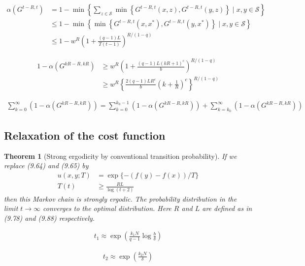 \documentclass{article}
\newtheorem{theorem}{Theorem}
\begin{document}
\begin{align*}
\alpha\left(G^{t-R, t}\right) & =1-\min \left\{\sum_{z \in \mathcal{S}} \min \left\{G^{t-R, t}(x, z), G^{t-R, t}(y, z)\right\} \mid x, y \in \mathcal{S}\right\} \\
& \leq 1-\min \left\{\min \left\{G^{t-R, t}\left(x, x^{*}\right), G^{t-R, t}\left(y, x^{*}\right)\right\} \mid x, y \in \mathcal{S}\right\} \\
& \leq 1-w^{R}\left(1+\frac{(q-1) L}{T(t-1)}\right)^{R /(1-q)}
\tag{9.92}
\end{align*}

\begin{align*}
1-\alpha\left(G^{k R-R, k R}\right) & \geq w^{R}\left(1+\frac{(q-1) L(k R+1)^{c}}{b}\right)^{R /(1-q)} \\
& \geq w^{R}\left\{\frac{2(q-1) L R^{c}}{b}\left(k+\frac{1}{R}\right)^{c}\right\}^{R /(1-q)}
\tag{9.93}
\end{align*}

\begin{align*}
\sum_{k=0}^{\infty}\left(1-\alpha\left(G^{k R-R, k R}\right)\right)=\sum_{k=0}^{k_{0}-1}\left(1-\alpha\left(G^{k R-R, k R}\right)\right)+\sum_{k=k_{0}}^{\infty}\left(1-\alpha\left(G^{k R-R, k R}\right)\right) \tag{9.94}
\end{align*}

\subsection{Relaxation of the cost function}

\begin{theorem}[Strong ergodicity by conventional transition probability]
If we replace (9.64) and (9.65) by
\begin{align*}
u(x, y ; T) & =\exp \{-(f(y)-f(x)) / T\}  \tag{9.95}\\
T(t) & \geq \frac{R L}{\log (t+2)}
\tag{9.96}
\end{align*}
then this Markov chain is strongly ergodic. The probability distribution in the limit \(t \rightarrow \infty\) converges to the optimal distribution. Here \(R\) and \(L\) are defined as in (9.78) and (9.88) respectively.
\end{theorem}

\begin{align*}
t_{1} \approx \exp \left(\frac{k_{1} N}{q-1} \log \frac{b}{\delta}\right) \tag{9.97}
\end{align*}

\begin{align*}
t_{2} \approx \exp \left(\frac{k_{2} N}{\delta}\right) \tag{9.98}
\end{align*}
\end{document}
